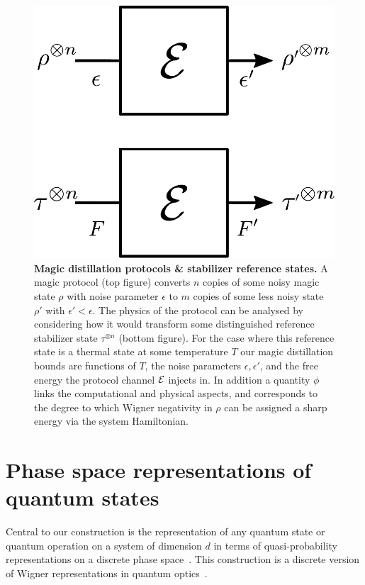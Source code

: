 \documentclass[pra,
aps,
twocolumn,
superscriptaddress,
groupedaddress,
nofootinbib,
reprint
]{revtex4-1}
\begin{document}
\begin{figure}[t]
    \centering
        \includegraphics[scale=0.3]{figs/protocol_diagram.pdf}
    \caption{\textbf{Magic distillation protocols \& stabilizer reference states.} 
	A magic protocol (top figure) converts $n$ copies of some noisy magic state $\rho$ with noise parameter $\epsilon$ to $m$ copies of some less noisy state $\rho'$ with $\epsilon' < \epsilon$. The physics of the protocol can be analysed by considering how it would transform some distinguished reference stabilizer state $\tau^{\otimes n}$ (bottom figure). For the case where this reference state is a thermal state at some temperature $T$ our magic distillation bounds are functions of $T$, the noise parameters $\epsilon, \epsilon'$, and the free energy the protocol channel ${\mathcal E}$ injects in. In addition a quantity $\phi$ links the computational and physical aspects, and corresponds to the degree to which Wigner negativity in $\rho$ can be assigned a sharp energy via the system Hamiltonian.}
    \label{fig:sketch}
\end{figure}

\section{Phase space representations of quantum states}
\label{sec:ps}

Central to our construction is the representation of any quantum state or quantum operation on a system of dimension $d$ in terms of quasi-probability representations on a discrete phase space~\cite{Ferrie_2008}. This construction is a discrete version of Wigner representations in quantum optics~\cite{Wigner_1932, Vourdas_2004}.
\end{document}
